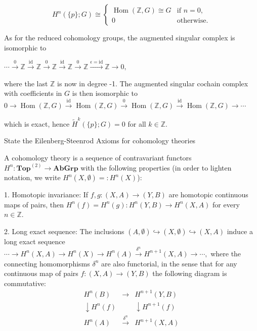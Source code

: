 \[H^n(\{p\}; G) \cong 
\begin{cases}
\operatorname{Hom}(\mathbb{Z}, G) \cong G & \text{if } n = 0, \\
0 & \text{otherwise.}
\end{cases}\]

As for the reduced cohomology groups, the augmented singular complex is isomorphic to

\(\cdots \xrightarrow{0} \mathbb{Z} \xrightarrow{\text{id}} \mathbb{Z} \xrightarrow{0} \mathbb{Z} \xrightarrow{\text{id}} \mathbb{Z} \xrightarrow{0} \mathbb{Z} \xrightarrow{\epsilon = \text{id}} \mathbb{Z} \longrightarrow 0,\)

where the last \(\mathbb{Z}\) is now in degree -1. The augmented singular cochain complex with coefficients in \(G\) is then isomorphic to
\(
0 \longrightarrow \operatorname{Hom}(\mathbb{Z}, G) \xrightarrow{\text{id}} \operatorname{Hom}(\mathbb{Z}, G) \xrightarrow{0} \operatorname{Hom}(\mathbb{Z}, G) \xrightarrow{\text{id}} \operatorname{Hom}(\mathbb{Z}, G) \longrightarrow \dotsb 
\)

which is exact, hence \(\tilde{H}^k(\{p\}; G) = 0\) for all \(k \in \mathbb{Z}\).

State the Eilenberg-Steenrod Axioms for cohomology theories

A cohomology theory is a sequence of contravariant functors \(H^n \colon \textbf{Top}^{(2)} \to \textbf{AbGrp}\) 
with the following properties (in order to lighten notation, we write \(H^n(X, \emptyset) =: H^n(X)\)): 

1.  Homotopic invariance: If \(f, g \colon (X, A) \to (Y, B)\) are homotopic continuous maps of pairs, then \(H^n(f) = H^n(g) \colon H^n(Y, B) \to H^n(X, A)\) 
    for every \(n \in \mathbb{Z}\).

2.  Long exact sequence: The inclusions 
    \((A, \emptyset) \hookrightarrow (X, \emptyset) \hookrightarrow (X, A)\)
    induce a long exact sequence
    \(\cdots \longrightarrow H^n(X, A) \longrightarrow H^n(X) \longrightarrow H^n(A) \xrightarrow{\delta^n} H^{n+1}(X, A) \longrightarrow \cdots, \)
    where the connecting homomorphisms \(\delta^n\) are also functorial, in the sense that for any continuous map of pairs \(f \colon (X, A) \to (Y, B)\) 
    the following diagram is commutative:
\[\begin{array}{ccc}
H^n(B) & \longrightarrow & H^{n+1}(Y, B) \\
\downarrow H^n(f) & & \downarrow H^{n+1}(f) \\
H^n(A) & \xrightarrow{\delta^n} & H^{n+1}(X, A)
\end{array}\]

